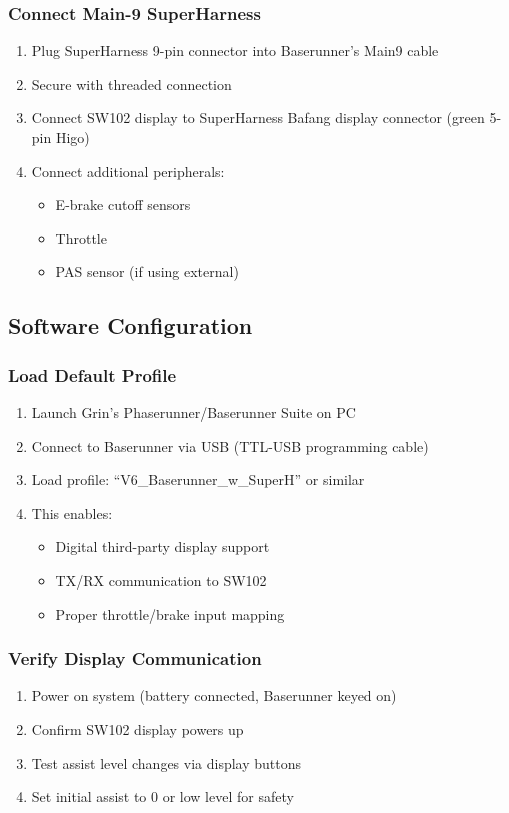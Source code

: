 \documentclass[11pt,a4paper]{article}
\begin{document}
\subsubsection{Connect Main-9 SuperHarness}
\begin{enumerate}
    \item Plug SuperHarness 9-pin connector into Baserunner's Main9 cable
    \item Secure with threaded connection
    \item Connect SW102 display to SuperHarness Bafang display connector (green 5-pin Higo)
    \item Connect additional peripherals:
    \begin{itemize}
        \item E-brake cutoff sensors
        \item Throttle
        \item PAS sensor (if using external)
    \end{itemize}
\end{enumerate}

\subsection{Software Configuration}

\subsubsection{Load Default Profile}
\begin{enumerate}
    \item Launch Grin's Phaserunner/Baserunner Suite on PC
    \item Connect to Baserunner via USB (TTL-USB programming cable)
    \item Load profile: ``V6\_Baserunner\_w\_SuperH'' or similar
    \item This enables:
    \begin{itemize}
        \item Digital third-party display support
        \item TX/RX communication to SW102
        \item Proper throttle/brake input mapping
    \end{itemize}
\end{enumerate}

\subsubsection{Verify Display Communication}
\begin{enumerate}
    \item Power on system (battery connected, Baserunner keyed on)
    \item Confirm SW102 display powers up
    \item Test assist level changes via display buttons
    \item Set initial assist to 0 or low level for safety
\end{enumerate}
\end{document}

